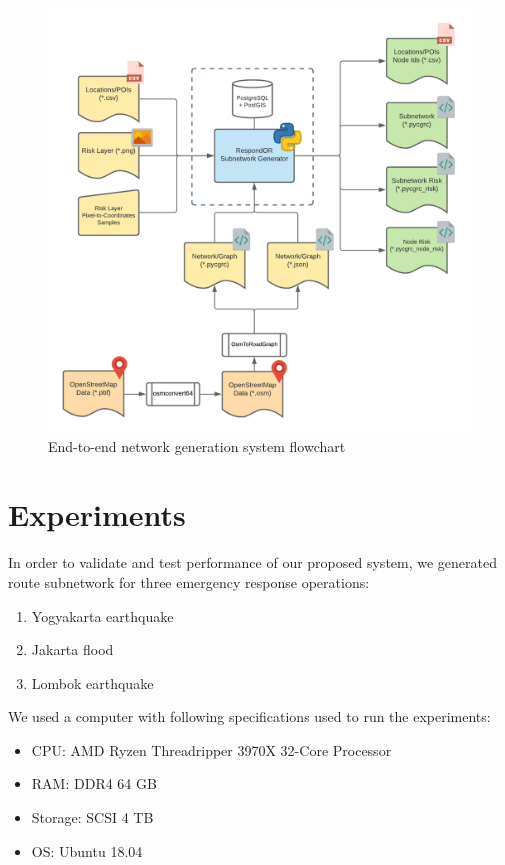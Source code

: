 \documentclass[conference]{IEEEtran}
\begin{document}
\begin{figure}
\centerline{\includegraphics[scale=0.5]{system-flowchart.png}}
\caption{End-to-end network generation system flowchart}
\label{fig_system_flowchart}
\end{figure}

\section{Experiments}

In order to validate and test performance of our proposed system, we generated route subnetwork for three emergency response operations:

\begin{enumerate}
\item Yogyakarta earthquake
\item Jakarta flood
\item Lombok earthquake
\end{enumerate}

We used a computer with following specifications used to run the experiments:

\begin{itemize}
\item CPU: AMD Ryzen Threadripper 3970X 32-Core Processor
\item RAM: DDR4 64 GB
\item Storage: SCSI 4 TB
\item OS: Ubuntu 18.04
\end{itemize}
\end{document}
